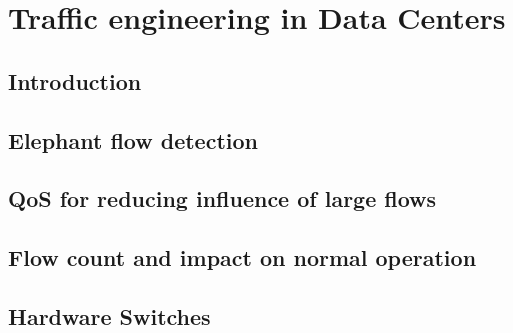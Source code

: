\chapter{Traffic engineering in Data Centers} \label{chap:me} %

\section {Introduction}
\section {Elephant flow detection}
\section {QoS for reducing influence of large flows}
\section {Flow count and impact on normal operation}
\section {Hardware Switches}
